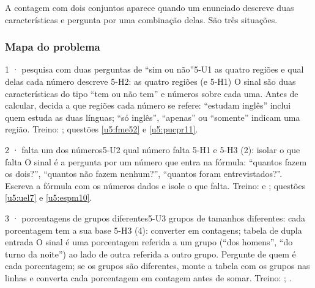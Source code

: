 \OndeEUsado

A contagem com dois conjuntos aparece quando um enunciado descreve duas características e pergunta por uma combinação delas. São três situações.

\subsubsection{Mapa do problema}

\begin{caso}{1 · pesquisa com duas perguntas de \enquote{sim ou não}}{5-U1}
{as quatro regiões e qual delas cada número descreve}
{5-H2: as quatro regiões (e 5-H1)}
\reconhecer O sinal são duas características do tipo \enquote{tem ou não tem} e números sobre cada uma. Antes de calcular, decida a que regiões cada número se refere: \enquote{estudam inglês} inclui quem estuda as duas línguas; \enquote{só inglês}, \enquote{apenas} ou \enquote{somente} indicam uma região. Treino: ; questões \ref{u5:fme52} e \ref{u5:pucpr11}.
\end{caso}

\begin{caso}{2 · falta um dos números}{5-U2}
{qual número falta}
{5-H1 e 5-H3 (2): isolar o que falta}
\reconhecer O sinal é a pergunta por um número que entra na fórmula: \enquote{quantos fazem os dois?}, \enquote{quantos não fazem nenhum?}, \enquote{quantos foram entrevistados?}. Escreva a fórmula com os números dados e isole o que falta. Treino:  e ; questões \ref{u5:uel7} e \ref{u5:espm10}.
\end{caso}

\begin{caso}{3 · porcentagens de grupos diferentes}{5-U3}
{grupos de tamanhos diferentes: cada porcentagem tem a sua base}
{5-H3 (4): converter em contagens; tabela de dupla entrada}
\reconhecer O sinal é uma porcentagem referida a um grupo (\enquote{dos homens}, \enquote{do turno da noite}) ao lado de outra referida a outro grupo. Pergunte de quem é cada porcentagem; se os grupos são diferentes, monte a tabela com os grupos nas linhas e converta cada porcentagem em contagem antes de somar. Treino: ; .
\end{caso}

